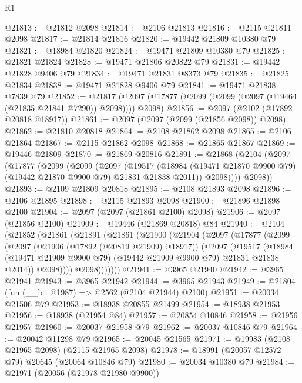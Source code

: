 \begin{lexlean}{R1}
\begin{coremodule}
@21813 := @21812 @2098
@21814 := @2106 @21813
@21816 := @2115 @21811 @2098
@21817 := @21814 @21816
@21820 := @19442 @21809 @10380 @79
@21821 := @18984 @21820
@21824 := @19471 @21809 @10380 @79
@21825 := @21821 @21824
@21828 := @19471 @21806 @20822 @79
@21831 := @19442 @21828 @9406 @79
@21834 := @19471 @21831 @8373 @79
@21835 := @21825 @21834
@21838 := @19471 @21828 @9406 @79
@21841 := @19471 @21838 @7839 @79
@21852 := @21817 (@2097 (@17877 (@2099 (@2099 (@2097 (@19464 (@21835 @21841 @7290)) @2098)))) @2098)
@21856 := @2097 (@2102 (@17892 @20818 @18917))
@21861 := @2097 (@2097 (@2099 (@21856 @2098)) @2098)
@21862 := @21810 @20818
@21864 := @2108 @21862 @2098
@21865 := @2106 @21864
@21867 := @2115 @21862 @2098
@21868 := @21865 @21867
@21869 := @19446 @21809
@21870 := @21869 @20816
@21891 := @21868
    (@2104
      (@2097
        (@17877
          (@2099
            (@2099
              (@2097
                (@19517
                  (@18984 (@19471 @21870 @9900 @79) (@19442 @21870 @9900 @79) @21831 @21838 @2011))
                @2098))))
        @2098))
@21893 := @2109 @21809 @20818
@21895 := @2108 @21893 @2098
@21896 := @2106 @21895
@21898 := @2115 @21893 @2098
@21900 := @21896 @21898 @2100
@21904 := @2097 (@2097 (@21861 @2100) @2098)
@21906 := @2097 (@21856 @2100)
@21909 := @19446 (@21869 @20818) @84
@21940 := @2104
    (@21852
      (@21861
        (@21891
          (@21861
            (@21900
              (@21904
                (@2097
                  (@17877
                    (@2099
                      (@2097
                        (@21906 (@17892 (@20819 @21909) @18917))
                        (@2097
                          (@19517
                            (@18984
                              (@19471 @21909 @9900 @79)
                              (@19442 @21909 @9900 @79)
                              @21831
                              @21838
                              @2014))
                          @2098))))
                  @2098)))))))
@21941 := @3965 @21940
@21942 := @3965 @21941
@21943 := @3965 @21942
@21944 := @3965 @21943
@21949 := @21804 (fun (__b : @1987) => @2562 (@2104 @21944) @2100)
@21951 := @20034 @21506 @79
@21953 := @18938 @20855 @21499
@21954 := @18938 @21953
@21956 := @18938 (@21954 @84)
@21957 := @20854 @10846
@21958 := @21956 @21957
@21960 := @20037 @21958 @79
@21962 := @20037 @10846 @79
@21964 := @20042 @11298 @79
@21965 := @20045 @21565
@21971 := @19983 (@2108 @21965 @2098) (@2115 @21965 @2098)
@21978 := @18991 (@20057 @12572 @79) @20645 (@20064 @10846 @79)
@21980 := @20034 @10380 @79
@21984 := @21971 (@20056 (@21978 @21980 @9900))

\end{coremodule}
\end{lexlean}
